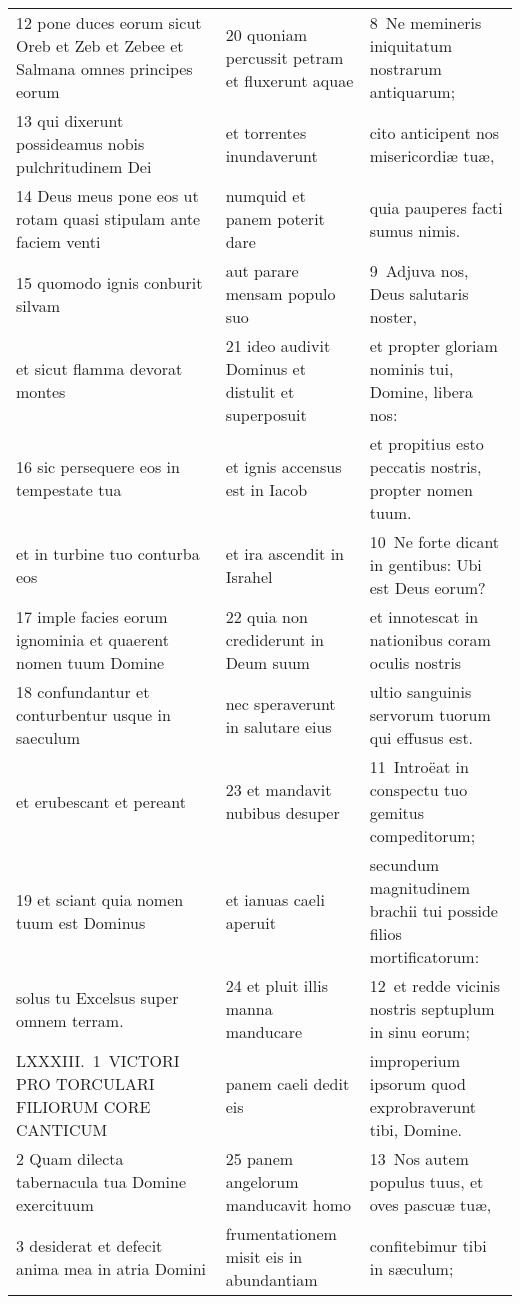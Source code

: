 \documentclass{article}
\begin{document}
\begin{longtable}{@{}p{}p{}p{}@{}}
12 pone duces eorum sicut Oreb et Zeb et Zebee et Salmana omnes principes eorum	&	20 quoniam percussit petram et fluxerunt aquae	&	8 Ne memineris iniquitatum nostrarum antiquarum;	\\
13 qui dixerunt possideamus nobis pulchritudinem Dei	&	et torrentes inundaverunt	&	cito anticipent nos misericordiæ tuæ,	\\
14 Deus meus pone eos ut rotam quasi stipulam ante faciem venti	&	numquid et panem poterit dare	&	quia pauperes facti sumus nimis.	\\
15 quomodo ignis conburit silvam	&	aut parare mensam populo suo	&	9 Adjuva nos, Deus salutaris noster,	\\
et sicut flamma devorat montes	&	21 ideo audivit Dominus et distulit et superposuit	&	et propter gloriam nominis tui, Domine, libera nos:	\\
16 sic persequere eos in tempestate tua	&	et ignis accensus est in Iacob	&	et propitius esto peccatis nostris, propter nomen tuum.	\\
et in turbine tuo conturba eos	&	et ira ascendit in Israhel	&	10 Ne forte dicant in gentibus: Ubi est Deus eorum?	\\
17 imple facies eorum ignominia et quaerent nomen tuum Domine	&	22 quia non crediderunt in Deum suum	&	et innotescat in nationibus coram oculis nostris	\\
18 confundantur et conturbentur usque in saeculum	&	nec speraverunt in salutare eius	&	ultio sanguinis servorum tuorum qui effusus est.	\\
et erubescant et pereant	&	23 et mandavit nubibus desuper	&	11 Introëat in conspectu tuo gemitus compeditorum;	\\
19 et sciant quia nomen tuum est Dominus	&	et ianuas caeli aperuit	&	secundum magnitudinem brachii tui posside filios mortificatorum:	\\
solus tu Excelsus super omnem terram.	&	24 et pluit illis manna manducare	&	12 et redde vicinis nostris septuplum in sinu eorum;	\\
LXXXIII. 1 VICTORI PRO TORCULARI FILIORUM CORE CANTICUM	&	panem caeli dedit eis	&	improperium ipsorum quod exprobraverunt tibi, Domine.	\\
2 Quam dilecta tabernacula tua Domine exercituum	&	25 panem angelorum manducavit homo	&	13 Nos autem populus tuus, et oves pascuæ tuæ,	\\
3 desiderat et defecit anima mea in atria Domini	&	frumentationem misit eis in abundantiam	&	confitebimur tibi in sæculum;	\\

\end{longtable}
\end{document}
